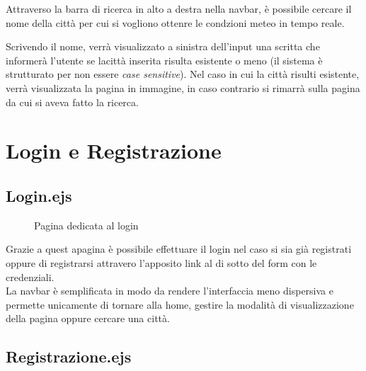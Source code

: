 Attraverso la barra di ricerca in alto a destra nella navbar, è possibile cercare il nome della città per cui si 
vogliono ottenre le condzioni meteo in tempo reale.\\

\vspace{5mm}

Scrivendo il nome, verrà visualizzato a sinistra dell'input una scritta che informerà l'utente se lacittà inserita 
risulta esistente o meno (il sistema è strutturato per non essere \emph{case sensitive}). Nel caso in cui la città risulti 
esistente, verrà visualizzata la pagina in immagine, in caso contrario si rimarrà sulla pagina da cui si aveva fatto la ricerca.

\section{Login e Registrazione}

\subsection{Login.ejs}

\begin{figure}[ht]
    \centering
    \caption{Pagina dedicata al login}
\end{figure}

Grazie a quest apagina è possibile effettuare il login nel caso si sia già registrati oppure di registrarsi attravero l'apposito 
link al di sotto del form con le credenziali.\\
La navbar è semplificata in modo da rendere l'interfaccia meno dispersiva e permette unicamente di tornare alla home, gestire 
la modalità di visualizzazione della pagina oppure cercare una città.

\newpage
\subsection{Registrazione.ejs}

